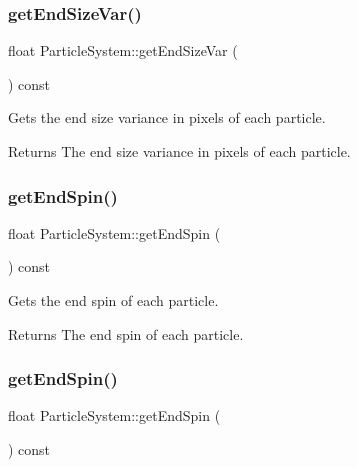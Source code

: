 \subsubsection{\texorpdfstring{get\+End\+Size\+Var()}{getEndSizeVar()}\hspace{0.1cm}{\footnotesize\ttfamily [2/2]}}
{\footnotesize\ttfamily float Particle\+System\+::get\+End\+Size\+Var (\begin{DoxyParamCaption}{ }\end{DoxyParamCaption}) const\hspace{0.3cm}{\ttfamily [inline]}}

Gets the end size variance in pixels of each particle.

\begin{DoxyReturn}{Returns}
The end size variance in pixels of each particle. 
\end{DoxyReturn}
\mbox{\label{classParticleSystem_a2e9d4d703536adc24dda1b06d8472649}} 
\subsubsection{\texorpdfstring{get\+End\+Spin()}{getEndSpin()}\hspace{0.1cm}{\footnotesize\ttfamily [1/2]}}
{\footnotesize\ttfamily float Particle\+System\+::get\+End\+Spin (\begin{DoxyParamCaption}{ }\end{DoxyParamCaption}) const\hspace{0.3cm}{\ttfamily [inline]}}

Gets the end spin of each particle.

\begin{DoxyReturn}{Returns}
The end spin of each particle. 
\end{DoxyReturn}
\mbox{\label{classParticleSystem_a2e9d4d703536adc24dda1b06d8472649}} 
\subsubsection{\texorpdfstring{get\+End\+Spin()}{getEndSpin()}\hspace{0.1cm}{\footnotesize\ttfamily [2/2]}}
{\footnotesize\ttfamily float Particle\+System\+::get\+End\+Spin (\begin{DoxyParamCaption}{ }\end{DoxyParamCaption}) const\hspace{0.3cm}{\ttfamily [inline]}}

